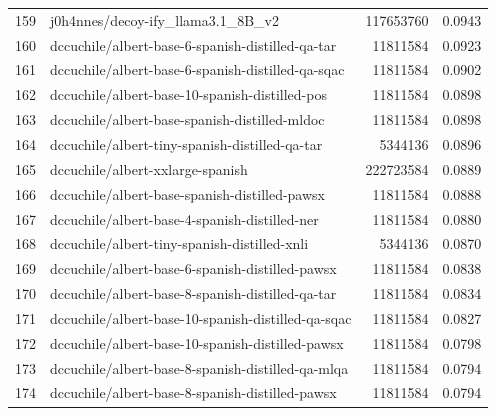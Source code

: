 {\begin{xltabular}{\textwidth}{l X rc}
    159              & j0h4nnes/decoy-ify\_llama3.1\_8B\_v2                                       & 117653760     & 0.0943       \\
    160              & dccuchile/albert-base-6-spanish-distilled-qa-tar                           & 11811584      & 0.0923       \\
    161              & dccuchile/albert-base-6-spanish-distilled-qa-sqac                          & 11811584      & 0.0902       \\
    162              & dccuchile/albert-base-10-spanish-distilled-pos                             & 11811584      & 0.0898       \\
    163              & dccuchile/albert-base-spanish-distilled-mldoc                              & 11811584      & 0.0898       \\
    164              & dccuchile/albert-tiny-spanish-distilled-qa-tar                             & 5344136       & 0.0896       \\
    165              & dccuchile/albert-xxlarge-spanish                                           & 222723584     & 0.0889       \\
    166              & dccuchile/albert-base-spanish-distilled-pawsx                              & 11811584      & 0.0888       \\
    167              & dccuchile/albert-base-4-spanish-distilled-ner                              & 11811584      & 0.0880       \\
    168              & dccuchile/albert-tiny-spanish-distilled-xnli                               & 5344136       & 0.0870       \\
    169              & dccuchile/albert-base-6-spanish-distilled-pawsx                            & 11811584      & 0.0838       \\
    170              & dccuchile/albert-base-8-spanish-distilled-qa-tar                           & 11811584      & 0.0834       \\
    171              & dccuchile/albert-base-10-spanish-distilled-qa-sqac                         & 11811584      & 0.0827       \\
    172              & dccuchile/albert-base-10-spanish-distilled-pawsx                           & 11811584      & 0.0798       \\
    173              & dccuchile/albert-base-8-spanish-distilled-qa-mlqa                          & 11811584      & 0.0794       \\
    174              & dccuchile/albert-base-8-spanish-distilled-pawsx                            & 11811584      & 0.0794       \\

\end{xltabular}}
